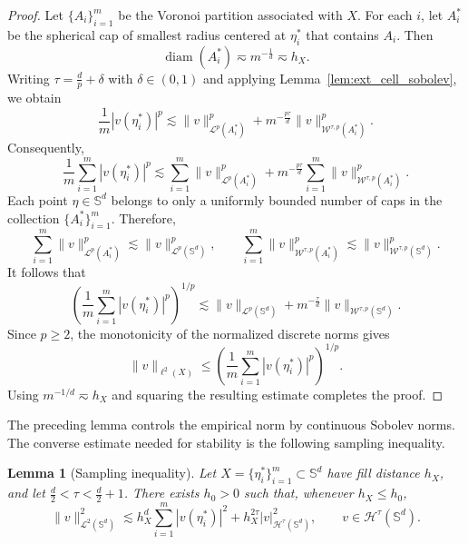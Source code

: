 \documentclass{article}
\numberwithin{equation}{section}
\newtheorem{lemma}{Lemma}
\def\SS{\mathbb{S}}
\def\sul{\sum\limits}
\begin{document}
\begin{proof}
Let $\{A_i\}_{i=1}^m$ be the Voronoi partition associated with $X$. For each $i$, let $A_i^*$ be the spherical cap of smallest radius centered at $\eta_i^*$ that contains $A_i$. Then
\begin{equation*}
    \operatorname{diam}(A_i^*)\eqsim m^{-\frac1d}\eqsim h_X.
\end{equation*}
Writing $\tau=\frac dp+\delta$ with $\delta\in(0,1)$ and applying Lemma~\ref{lem:ext_cell_sobolev}, we obtain
\begin{equation*}
    \frac{1}{m}|v(\eta_i^*)|^p
    \lesssim \|v\|_{\mathcal{L}^p(A_i^*)}^p
    +m^{-\frac{p\tau}{d}}\|v\|_{\mathcal W^{\tau,p}(A_i^*)}^p.
\end{equation*}
Consequently,
\begin{equation*}
    \frac{1}{m}\sul_{i=1}^m|v(\eta_i^*)|^p
    \lesssim\sul_{i=1}^m\|v\|_{\mathcal{L}^p(A_i^*)}^p
    +m^{-\frac{p\tau}{d}}\sul_{i=1}^m\|v\|_{\mathcal W^{\tau,p}(A_i^*)}^p.
\end{equation*}
Each point $\eta\in\SS^d$ belongs to only a uniformly bounded number of caps in the collection $\{A_i^*\}_{i=1}^m$. Therefore,
\begin{equation*}
    \sul_{i=1}^m\|v\|_{\mathcal{L}^p(A_i^*)}^p\lesssim\|v\|_{\mathcal L^p(\SS^d)}^p,\qquad
    \sul_{i=1}^m\|v\|_{\mathcal W^{\tau,p}(A_i^*)}^p\lesssim\|v\|_{\mathcal W^{\tau,p}(\SS^d)}^p.
\end{equation*}
It follows that
\begin{equation*}
    \left(\frac{1}{m}\sul_{i=1}^m|v(\eta_i^*)|^p\right)^{1/p}
    \lesssim\|v\|_{\mathcal L^p(\SS^d)}
    +m^{-\frac{\tau}{d}}\|v\|_{\mathcal W^{\tau,p}(\SS^d)}.
\end{equation*}
Since $p\geq2$, the monotonicity of the normalized discrete norms gives
\begin{equation*}
    \|v\|_{\ell^2(X)}
    \leq\left(\frac{1}{m}\sul_{i=1}^m|v(\eta_i^*)|^p\right)^{1/p}.
\end{equation*}
Using $m^{-1/d}\eqsim h_X$ and squaring the resulting estimate completes the proof.
\end{proof}


The preceding lemma controls the empirical norm by continuous Sobolev norms. The converse estimate needed for stability is the following sampling inequality.

\begin{lemma}[Sampling inequality]\label{lem_cont_by_discrete}
Let $X=\{\eta_i^*\}_{i=1}^m\subset\SS^d$ have fill distance $h_X$, and let $\frac{d}{2}<\tau<\frac{d}{2}+1$. There exists $h_0>0$ such that, whenever $h_X\leq h_0$,
\begin{equation}\label{eqn:sampling_inequality}
\|v\|_{\mathcal L^2(\SS^d)}^2\lesssim h_X^d\sul_{i=1}^m|v(\eta_i^*)|^2+h_X^{2\tau}|v|_{\mathcal H^\tau(\SS^d)}^2,\qquad v\in\mathcal H^\tau(\SS^d).
\end{equation}
\end{lemma}
\end{document}
